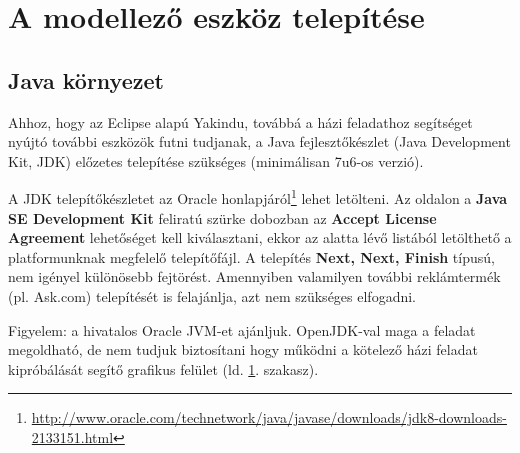 \section{A modellező eszköz telepítése}
\label{sec:modellezo-eszkoz-telepitese}

\subsection{Java környezet}
Ahhoz, hogy az Eclipse alapú Yakindu, továbbá a házi feladathoz segítséget nyújtó további eszközök futni tudjanak, a Java fejlesztőkészlet (Java Development Kit, JDK) előzetes telepítése szükséges (minimálisan 7u6-os verzió).

A JDK telepítőkészletet az Oracle honlapjáról\footnote{\url{http://www.oracle.com/technetwork/java/javase/downloads/jdk8-downloads-2133151.html}} lehet letölteni. Az oldalon a \textbf{Java SE Development Kit} feliratú szürke dobozban az \textbf{Accept License Agreement} lehetőséget kell kiválasztani, ekkor az alatta lévő listából letölthető a platformunknak megfelelő telepítőfájl. A telepítés \textbf{Next, Next, Finish} típusú, nem igényel különösebb fejtörést. Amennyiben valamilyen további reklámtermék (pl. Ask.com) telepítését is felajánlja, azt nem szükséges elfogadni.

\begin{megjegyzes}
Figyelem: a hivatalos Oracle JVM-et ajánljuk. OpenJDK-val maga a feladat megoldható, de nem tudjuk biztosítani hogy működni a kötelező házi feladat kipróbálását segítő grafikus felület (ld. \ref{sec:modellezo-eszkoz-telepitese}. szakasz).
\end{megjegyzes}

\begin{comment}
Telepítés után érdemes beállítani a \codeEsc{JAVA\_HOME} változót, valamint hozzáadni a Java elérési útját a PATH-hoz. Ehhez Windowson a követketzőt kell tenni.

\begin{itemize}
\item A számítógép ikonra jobb gombal kattintva válasszuk a \textbf{Properties} (Tulajdonságok) lehetőséget. (Elérhető a \textbf{Control Panel} | \textbf{System and Security} | \textbf{System} úton is.)
\item A bal oldali menü lehetőségei közül kattintsunk az \\textbf{Advanced System Settings}-re.
\item Itt nyomjunk rá az \textbf{Environment Variables} gombra.
\item Ha még nincs \codeEsc{JAVA_HOME} változó, létre kell hozni. \codeEsc{JAVA_HOME} legyen a neve, az értéke pedig a frissen installált Java könyvtár elérési útja. Ha szóközöket tartalmaz, érdemes rövidítéseket használni, pl. \codeEsc{C:\Progra~1\Java\jdk1.8.0\_31}
\item Jelöljük ki a \codeEsc{Path} változót, majd \textbf{Edit}. A változó jelenlegi értékét ne töröljük ki, csak írjunk a végére egy pontosvesszőt, majd a JDK-n belüli bin könyvtár elérési útját.
\end{itemize}
\end{comment}

